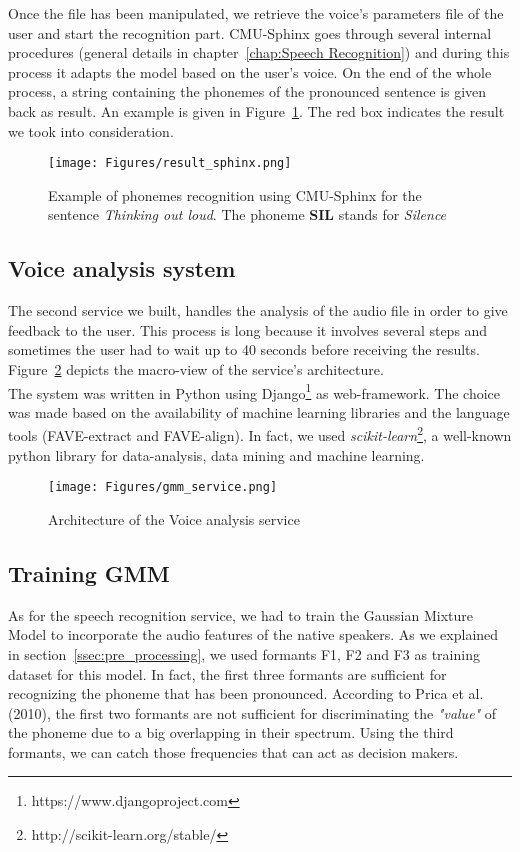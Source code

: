 \noindent Once the file has been manipulated, we retrieve the voice's parameters file of the user and start the recognition part. CMU-Sphinx goes through several internal procedures (general details in chapter~\ref{chap:Speech Recognition}) and during this process it adapts the model based on the user's voice. On the end of the whole process, a string containing the phonemes of the pronounced sentence is given back as result. An example is given in Figure~\ref{fig:result_sphinx}. The red box indicates the result we took into consideration.

\begin{figure}[!ht]
	\centering
	\texttt{[image: Figures/result\_sphinx.png]}
	\caption{Example of phonemes recognition using CMU-Sphinx for the sentence \textit{Thinking out loud}. The phoneme \textbf{SIL} stands for \textit{Silence}}
	\label{fig:result_sphinx}
\end{figure}

\subsection{Voice analysis system}
\label{ssec:training_gmm}

The second service we built, handles the analysis of the audio file in order to give feedback to the user. This process is long because it involves several steps and sometimes the user had to wait up to 40 seconds before receiving the results. Figure~\ref{fig:gmm_service} depicts the macro-view of the service's architecture. \\
\noindent The system was written in Python using Django\footnote{https://www.djangoproject.com} as web-framework. The choice was made based on the availability of machine learning libraries and the language tools (FAVE-extract and FAVE-align). In fact, we used \textit{scikit-learn}\footnote{http://scikit-learn.org/stable/}, a well-known python library for data-analysis, data mining and machine learning. \\

\begin{figure}[!ht]
	\centering
	\texttt{[image: Figures/gmm\_service.png]}
	\caption{Architecture of the Voice analysis service}
	\label{fig:gmm_service}
\end{figure}

\subsection{Training GMM}
\noindent As for the speech recognition service, we had to train the Gaussian Mixture Model to incorporate the audio features of the native speakers. As we explained in section~\ref{ssec:pre_processing}, we used formants F1, F2 and F3 as training dataset for this model. In fact, the first three formants are sufficient for recognizing the phoneme that has been pronounced. According to Prica et al. (2010), the first two formants are not sufficient for discriminating the \textit{"value"} of the phoneme due to a big overlapping in their spectrum. Using the third formants, we can catch those frequencies that can act as decision makers. \\

